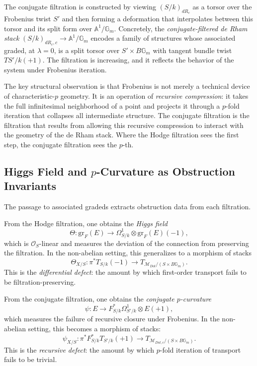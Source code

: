 \documentclass[12pt]{article}
\begin{document}
The conjugate filtration is constructed by viewing $(S/k)_{dR_c}$ as a torsor over the
Frobenius twist $S'$ and then forming a deformation that interpolates between this
torsor and its split form over $\mathbb{A}^1/\mathbb{G}_m$. Concretely, the
\emph{conjugate-filtered de Rham stack} $(S/k)_{dR_c,c} \to \mathbb{A}^1/\mathbb{G}_m$
encodes a family of structures whose associated graded, at $\lambda = 0$, is a split
torsor over $S' \times B\mathbb{G}_m$ with tangent bundle twist $TS'/k(+1)$. The
filtration is increasing, and it reflects the behavior of the system under Frobenius
iteration.

The key structural observation is that Frobenius is not merely a technical device of
characteristic-$p$ geometry. It is an operation of \emph{recursive compression}: it
takes the full infinitesimal neighborhood of a point and projects it through a
$p$-fold iteration that collapses all intermediate structure. The conjugate filtration
is the filtration that results from allowing this recursive compression to interact with
the geometry of the de Rham stack. Where the Hodge filtration sees the first step, the
conjugate filtration sees the $p$-th.

\subsection{Higgs Field and $p$-Curvature as Obstruction Invariants}

The passage to associated gradeds extracts obstruction data from each filtration.

From the Hodge filtration, one obtains the \emph{Higgs field}
\[
\Theta : \mathrm{gr}_F(E) \to \Omega^1_{S/k} \otimes \mathrm{gr}_F(E)(-1),
\]
which is $\mathcal{O}_S$-linear and measures the deviation of the connection from
preserving the filtration. In the non-abelian setting, this generalizes to a morphism
of stacks
\[
\Theta_{X/S} : \pi^* T_{S/k}(-1) \to T_{\mathcal{M}_{Dol}/(S \times B\mathbb{G}_m)}.
\]
This is the \emph{differential defect}: the amount by which first-order transport fails
to be filtration-preserving.

From the conjugate filtration, one obtains the \emph{conjugate $p$-curvature}
\[
\psi : E \to F^*_{S/k}\Omega^1_{S'/k} \otimes E(+1),
\]
which measures the failure of recursive closure under Frobenius. In the non-abelian
setting, this becomes a morphism of stacks:
\[
\psi_{X/S} : \pi^* F^*_{S/k}T_{S'/k}(+1) \to T_{\mathcal{M}_{Dol,c}/(S \times B\mathbb{G}_m)}.
\]
This is the \emph{recursive defect}: the amount by which $p$-fold iteration of
transport fails to be trivial.
\end{document}
